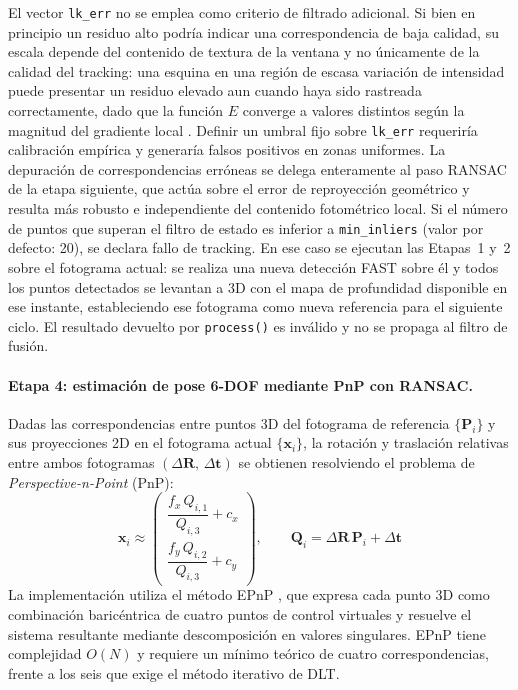El vector \texttt{lk\_err} no se emplea como criterio de filtrado adicional.
Si bien en principio un residuo alto podría indicar una correspondencia de
baja calidad, su escala depende del contenido de textura de la ventana y no
únicamente de la calidad del tracking: una esquina en una región de escasa
variación de intensidad puede presentar un residuo elevado aun cuando haya
sido rastreada correctamente, dado que la función $E$ converge a valores
distintos según la magnitud del gradiente local \cite{ShiTomasi1994}. Definir
un umbral fijo sobre \texttt{lk\_err} requeriría calibración empírica y
generaría falsos positivos en zonas uniformes. La depuración de correspondencias erróneas se delega
enteramente al paso RANSAC de la etapa siguiente, que actúa sobre el error de
reproyección geométrico y resulta más robusto e independiente del contenido
fotométrico local. Si el número de puntos que superan el filtro de estado es
inferior a \texttt{min\_inliers} (valor por defecto: 20), se declara fallo de
tracking. En ese caso se ejecutan las Etapas~1 y~2 sobre el fotograma actual:
se realiza una nueva detección FAST sobre él y todos los puntos detectados se
levantan a 3D con el mapa de profundidad disponible en ese instante,
estableciendo ese fotograma como nueva referencia para el siguiente ciclo.
El resultado devuelto por \texttt{process()} es inválido y no se propaga al
filtro de fusión.

\paragraph{Etapa 4: estimación de pose 6-DOF mediante PnP con RANSAC.}

Dadas las correspondencias entre puntos 3D del fotograma de referencia
$\{\mathbf{P}_i\}$ y sus proyecciones 2D en el fotograma actual
$\{\mathbf{x}_i\}$, la rotación y traslación relativas entre ambos fotogramas
$(\Delta\mathbf{R},\, \Delta\mathbf{t})$ se obtienen resolviendo el problema de
\emph{Perspective-n-Point} (PnP):
%
\begin{equation}
  \label{eq:pnp-reprojection}
  \mathbf{x}_i \approx
  \begin{pmatrix}
    \dfrac{f_x\, Q_{i,1}}{Q_{i,3}} + c_x \\[6pt]
    \dfrac{f_y\, Q_{i,2}}{Q_{i,3}} + c_y
  \end{pmatrix},
  \qquad
  \mathbf{Q}_i = \Delta\mathbf{R}\,\mathbf{P}_i + \Delta\mathbf{t}
\end{equation}
%
La implementación utiliza el método EPnP \cite{Lepetit2009EPnP}, que expresa
cada punto 3D como combinación baricéntrica de cuatro puntos de control
virtuales y resuelve el sistema resultante mediante descomposición en valores
singulares. EPnP tiene complejidad $O(N)$ y requiere un mínimo teórico de
cuatro correspondencias, frente a los seis que exige el método iterativo
de DLT.

